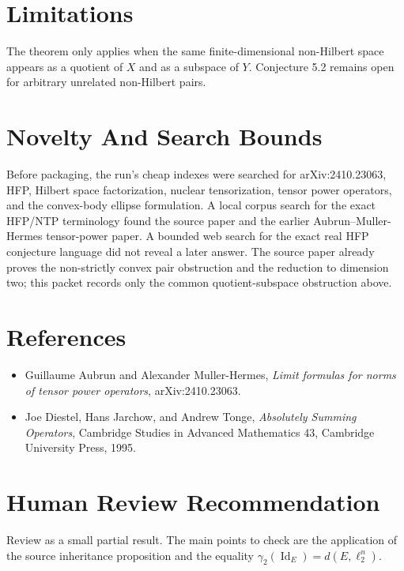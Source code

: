 \documentclass[11pt]{article}
\DeclareMathOperator{\Id}{Id}
\begin{document}
\section*{Limitations}

The theorem only applies when the same finite-dimensional non-Hilbert space
appears as a quotient of $X$ and as a subspace of $Y$. Conjecture 5.2 remains
open for arbitrary unrelated non-Hilbert pairs.

\section*{Novelty And Search Bounds}

Before packaging, the run's cheap indexes were searched for arXiv:2410.23063,
HFP, Hilbert space factorization, nuclear tensorization, tensor power
operators, and the convex-body ellipse formulation. A local corpus search for
the exact HFP/NTP terminology found the source paper and the earlier
Aubrun--Muller-Hermes tensor-power paper. A bounded web search for the exact
real HFP conjecture language did not reveal a later answer. The source paper
already proves the non-strictly convex pair obstruction and the reduction to
dimension two; this packet records only the common quotient-subspace
obstruction above.

\section*{References}

\begin{itemize}
  \item Guillaume Aubrun and Alexander Muller-Hermes, \emph{Limit formulas
  for norms of tensor power operators}, arXiv:2410.23063.
  \item Joe Diestel, Hans Jarchow, and Andrew Tonge, \emph{Absolutely Summing
  Operators}, Cambridge Studies in Advanced Mathematics 43, Cambridge
  University Press, 1995.
\end{itemize}

\section*{Human Review Recommendation}

Review as a small partial result. The main points to check are the application
of the source inheritance proposition and the equality
$\gamma_2(\Id_E)=d(E,\ell_2^n)$.
\end{document}

